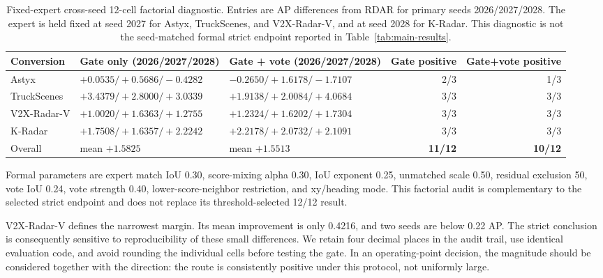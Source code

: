 \documentclass[preprint,12pt,times]{elsarticle}
\newcommand{\reviewcaption}[1]{\caption{\textcolor{floatreviewblue}{#1}}}
\newcommand{\reviewcaption}[1]{\caption{#1}}
\begin{document}
\begin{table}[H]
\centering
\reviewcaption{Fixed-expert cross-seed 12-cell factorial diagnostic. Entries
are AP differences from RDAR for primary seeds 2026/2027/2028. The expert is
held fixed at seed 2027 for Astyx, TruckScenes, and V2X-Radar-V, and at seed
2028 for K-Radar. This diagnostic is not the seed-matched formal strict
endpoint reported in Table~\ref{tab:main-results}.}
\label{tab:fixed-expert-factorial}
\begingroup
\color{black}
\scriptsize
\setlength{\tabcolsep}{3pt}
\renewcommand{\arraystretch}{1.15}
\begin{tabularx}{\columnwidth}{@{}lX Xrr@{}}
\toprule
Conversion & Gate only (2026/2027/2028) & Gate + vote (2026/2027/2028)
& Gate positive & Gate+vote positive \\
\midrule
Astyx & $+0.0535/+0.5686/-0.4282$ & $-0.2650/+1.6178/-1.7107$ & 2/3 & 1/3 \\
TruckScenes & $+3.4379/+2.8000/+3.0339$ & $+1.9138/+2.0084/+4.0684$ & 3/3 & 3/3 \\
V2X-Radar-V & $+1.0020/+1.6363/+1.2755$ & $+1.2324/+1.6202/+1.7304$ & 3/3 & 3/3 \\
K-Radar & $+1.7508/+1.6357/+2.2242$ & $+2.2178/+2.0732/+2.1091$ & 3/3 & 3/3 \\
\midrule
Overall & mean $+1.5825$ & mean $+1.5513$ & \textbf{11/12} & \textbf{10/12} \\
\bottomrule
\end{tabularx}
\endgroup
\vspace{2pt}
\parbox{\columnwidth}{\scriptsize
Formal parameters are expert match IoU 0.30, score-mixing alpha 0.30, IoU
exponent 0.25, unmatched scale 0.50, residual exclusion 50, vote IoU 0.24,
vote strength 0.40, lower-score-neighbor restriction, and xy/heading mode.
This factorial audit is complementary to the selected strict endpoint and does
not replace its threshold-selected 12/12 result.}
\end{table}

V2X-Radar-V defines the narrowest margin. Its mean improvement is only 0.4216,
and two seeds are below 0.22 AP. The strict conclusion is consequently
sensitive to reproducibility of these small differences. We retain four
decimal places in the audit trail, use identical evaluation code, and avoid
rounding the individual cells before testing the gate. In an operating-point
decision, the magnitude should be considered together with the direction:
the route is consistently positive under this protocol, not uniformly large.
\end{document}
